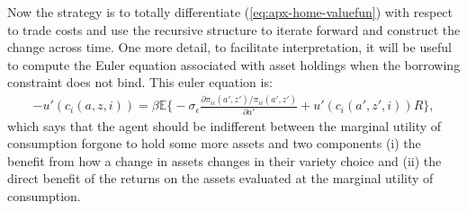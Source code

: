 \documentclass[12pt,pdftex]{article}
\begin{document}
\begin{onehalfspacing}
Now the strategy is to totally differentiate (\ref{eq:apx-home-valuefun}) with respect to trade costs and use the recursive structure to iterate forward and construct the change across time.  One more detail, to facilitate interpretation, it will be useful to compute the Euler equation associated with asset holdings when the borrowing constraint does not bind. This euler equation is:
\begin{align}
-u'(c_{i}(a,z,i)) = \beta \mathbb{E} \bigg \{ -\sigma_{\epsilon} \frac{\partial \pi_{ii}(a',z') / \pi_{ii}(a',z')}{\partial a'} + u'(c_{i}(a',z',i))R \bigg \},
\label{eq:apx-euler-equation}
\end{align}
which says that the agent should be indifferent between the marginal utility of consumption forgone to hold some more assets and two components (i) the benefit from how a change in assets changes in their variety choice and (ii) the direct benefit of the returns on the assets evaluated at the marginal utility of consumption.

%
%


\end{onehalfspacing}
\end{document}
